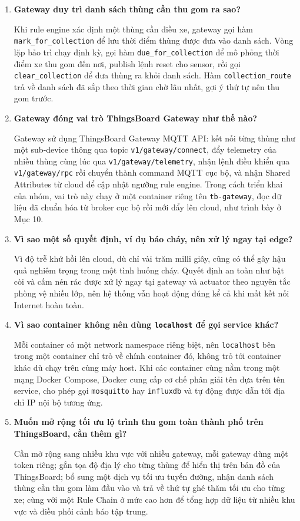 \documentclass[12pt,a4paper]{article}
\begin{document}
\begin{enumerate}
    \item \textbf{Gateway duy trì danh sách thùng cần thu gom ra sao?}

    Khi rule engine xác định một thùng cần điều xe, gateway gọi hàm \texttt{mark\_for\_collection} để lưu thời điểm thùng được đưa vào danh sách. Vòng lặp bảo trì chạy định kỳ, gọi hàm \texttt{due\_for\_collection} để mô phỏng thời điểm xe thu gom đến nơi, publish lệnh reset cho sensor, rồi gọi \texttt{clear\_collection} để đưa thùng ra khỏi danh sách. Hàm \texttt{collection\_route} trả về danh sách đã sắp theo thời gian chờ lâu nhất, gợi ý thứ tự nên thu gom trước.

    \item \textbf{Gateway đóng vai trò ThingsBoard Gateway như thế nào?}

    Gateway sử dụng ThingsBoard Gateway MQTT API: kết nối từng thùng như một sub-device thông qua topic \texttt{v1/gateway/connect}, đẩy telemetry của nhiều thùng cùng lúc qua \texttt{v1/gateway/telemetry}, nhận lệnh điều khiển qua \texttt{v1/gateway/rpc} rồi chuyển thành command MQTT cục bộ, và nhận Shared Attributes từ cloud để cập nhật ngưỡng rule engine. Trong cách triển khai của nhóm, vai trò này chạy ở một container riêng tên \texttt{tb-gateway}, đọc dữ liệu đã chuẩn hóa từ broker cục bộ rồi mới đẩy lên cloud, như trình bày ở Mục 10.

    \item \textbf{Vì sao một số quyết định, ví dụ báo cháy, nên xử lý ngay tại edge?}

    Vì độ trễ khứ hồi lên cloud, dù chỉ vài trăm milli giây, cũng có thể gây hậu quả nghiêm trọng trong một tình huống cháy. Quyết định an toàn như bật còi và cấm nén rác được xử lý ngay tại gateway và actuator theo nguyên tắc phòng vệ nhiều lớp, nên hệ thống vẫn hoạt động đúng kể cả khi mất kết nối Internet hoàn toàn.

    \item \textbf{Vì sao container không nên dùng \texttt{localhost} để gọi service khác?}

    Mỗi container có một network namespace riêng biệt, nên \texttt{localhost} bên trong một container chỉ trỏ về chính container đó, không trỏ tới container khác dù chạy trên cùng máy host. Khi các container cùng nằm trong một mạng Docker Compose, Docker cung cấp cơ chế phân giải tên dựa trên tên service, cho phép gọi \texttt{mosquitto} hay \texttt{influxdb} và tự động được dẫn tới địa chỉ IP nội bộ tương ứng.

    \item \textbf{Muốn mở rộng tối ưu lộ trình thu gom toàn thành phố trên ThingsBoard, cần thêm gì?}

    Cần mở rộng sang nhiều khu vực với nhiều gateway, mỗi gateway dùng một token riêng; gắn tọa độ địa lý cho từng thùng để hiển thị trên bản đồ của ThingsBoard; bổ sung một dịch vụ tối ưu tuyến đường, nhận danh sách thùng cần thu gom làm đầu vào và trả về thứ tự ghé thăm tối ưu cho từng xe; cùng với một Rule Chain ở mức cao hơn để tổng hợp dữ liệu từ nhiều khu vực và điều phối cảnh báo tập trung.
\end{enumerate}
\end{document}
